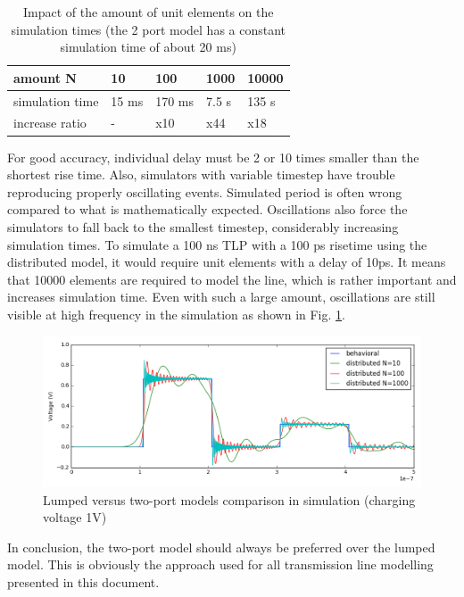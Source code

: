 \begin{table}[!h]
\centering
\begin{tabular}{@{}lllll@{}}
\toprule
amount N         &  10           & 100        &  1000      &   10000    \\ \midrule
simulation time  &  15 ms        & 170 ms     &  7.5 s     &   135 s    \\
increase ratio   &  -            & x10        &  x44       &   x18      \\
\bottomrule
\end{tabular}
\caption{Impact of the amount of unit elements on the simulation times (the 2 port model has a constant simulation time of about 20 ms)}
\label{tab:tline-impact-simulation-time}
\end{table}

For good accuracy, individual delay must be 2 or 10 times smaller than the shortest rise time.
Also, simulators with variable timestep have trouble reproducing properly oscillating events.
Simulated period is often wrong compared to what is mathematically expected.
Oscillations also force the simulators to fall back to the smallest timestep, considerably increasing simulation times.
To simulate a 100 ns TLP with a 100 ps risetime using the distributed model, it would require unit elements with a delay of 10ps.
It means that 10000 elements are required to model the line, which is rather important and increases simulation time.
Even with such a large amount, oscillations are still visible at high frequency in the simulation as shown in Fig. \ref{fig:lines-simulations}.

\begin{figure}[!h]
  \centering
  \includegraphics[width=\textwidth]{src/2/figures/tline_comparison.png}
  \caption{Lumped versus two-port models comparison in simulation (charging voltage 1V)}
  \label{fig:lines-simulations}
\end{figure}

In conclusion, the two-port model should always be preferred over the lumped model.
This is obviously the approach used for all transmission line modelling presented in this document.

